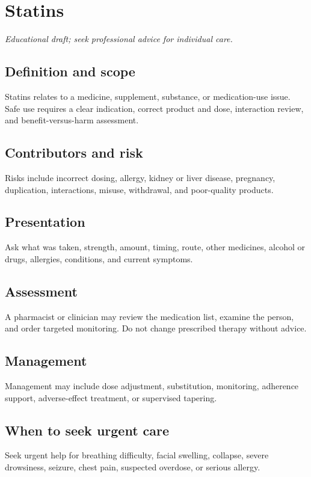 \chapter{Statins}
\medskip
\noindent\textit{Educational draft; seek professional advice for individual care.}

\section*{Definition and scope}
Statins relates to a medicine, supplement, substance, or medication-use issue. Safe use requires a clear indication, correct product and dose, interaction review, and benefit-versus-harm assessment.

\section*{Contributors and risk}
Risks include incorrect dosing, allergy, kidney or liver disease, pregnancy, duplication, interactions, misuse, withdrawal, and poor-quality products.

\section*{Presentation}
Ask what was taken, strength, amount, timing, route, other medicines, alcohol or drugs, allergies, conditions, and current symptoms.

\section*{Assessment}
A pharmacist or clinician may review the medication list, examine the person, and order targeted monitoring. Do not change prescribed therapy without advice.

\section*{Management}
Management may include dose adjustment, substitution, monitoring, adherence support, adverse-effect treatment, or supervised tapering.

\section*{When to seek urgent care}
Seek urgent help for breathing difficulty, facial swelling, collapse, severe drowsiness, seizure, chest pain, suspected overdose, or serious allergy.

